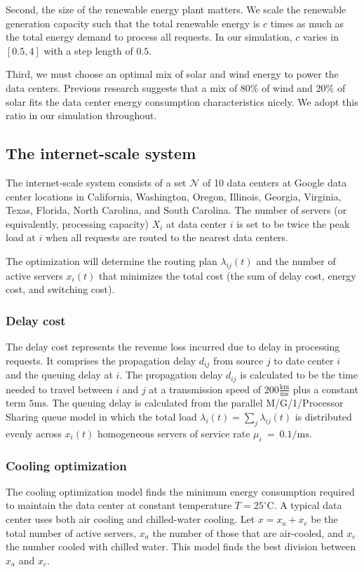 \documentclass{acm_proc_article-sp}
\begin{document}
Second, the size of the renewable energy plant matters. We scale the renewable generation capacity such that the total renewable energy is $c$ times as much as the total energy demand to process all requests. In our simulation, $c$ varies in $[0.5, 4]$ with a step length of $0.5$.

Third, we must choose an optimal mix of solar and wind energy to power the data centers. Previous research \cite{adam:GLB} suggests that a mix of 80\% of wind and 20\% of solar fits the data center energy consumption characteristics nicely. We adopt this ratio in our simulation throughout.
\subsection{The internet-scale system}
The internet-scale system consists of a set $\mathcal{N}$ of 10 data centers at Google data center locations in California, Washington, Oregon, Illinois, Georgia, Virginia, Texas, Florida, North Carolina, and South Carolina. The number of servers (or equivalently, processing capacity) $X_i$ at data center $i$ is set to be twice the peak load at $i$ when all requests are routed to the nearest data centers.

The optimization will determine the routing plan $\lambda_{ij}(t)$ and the number of active servers $x_i(t)$ that minimizes the total cost (the sum of delay cost, energy cost, and switching cost).

\subsubsection{Delay cost}
The delay cost represents the revenue loss incurred due to delay in processing requests. It comprises the propagation delay $d_{ij}$ from source $j$ to date center $i$ and the queuing delay at $i$.
The propagation delay $d_{ij}$ is calculated to be the time needed to travel between $i$ and $j$ at a transmission speed of $200 \frac{\mathrm{km}}{\mathrm{ms}}$ plus a constant term $5 \mathrm{ms}$. The queuing delay is calculated from the parallel M/G/1/Processor Sharing queue model in which the total load $\lambda_i(t)=\sum_j \lambda_{ij}(t)$ is distributed evenly across $x_i(t)$ homogeneous servers of service rate \mbox{$\mu_i$ = $0.1 / \mathrm{ms}$}.

\subsubsection{Cooling optimization}
The cooling optimization model finds the minimum energy consumption required to maintain the data center at constant temperature $T = 25^{\circ}\textrm{C}$. A typical data center uses both air cooling and chilled-water cooling. Let $x = x_a + x_c$ be the total number of active servers, $x_a$ the number of those that are air-cooled, and $x_c$ the number cooled with chilled water. This model finds the best division between $x_a$ and $x_c$.
\end{document}
